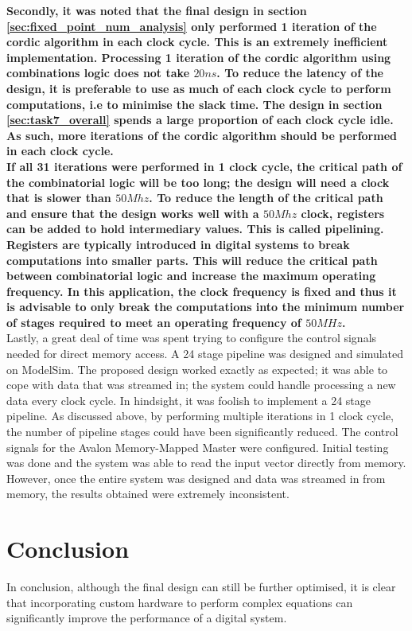 \documentclass{article}
\begin{document}
\textbf{Secondly, it was noted that the final design in section \ref{sec:fixed_point_num_analysis} only performed 1 iteration of the cordic algorithm in each clock cycle. This is an extremely inefficient implementation. Processing 1 iteration of the cordic algorithm using combinations logic does not take $20ns$. To reduce the latency of the design, it is preferable to use as much of each clock cycle to perform computations, i.e to minimise the slack time. The design in section \ref{sec:task7_overall} spends a large proportion of each clock cycle idle. As such, more iterations of the cordic algorithm should be performed in each clock cycle.} \\

\textbf{If all 31 iterations were performed in 1 clock cycle, the critical path of the combinatorial logic will be too long; the design will need a clock that is slower than $50Mhz$. To reduce the length of the critical path and ensure that the design works well with a $50Mhz$ clock, registers can be added to hold intermediary values. This is called pipelining. Registers are typically introduced in digital systems to break computations into smaller parts. This will reduce the critical path between combinatorial logic and increase the maximum operating frequency. In this application, the clock frequency is fixed and thus it is advisable to only break the computations into the minimum number of stages required to meet an operating frequency of $50MHz$.}\\

Lastly, a great deal of time was spent trying to configure the control signals needed for direct memory access. A 24 stage pipeline was designed and simulated on ModelSim. The proposed design worked exactly as expected; it was able to cope with data that was streamed in; the system could handle processing a new data every clock cycle. In hindsight, it was foolish to implement a 24 stage pipeline. As discussed above, by performing multiple iterations in 1 clock cycle, the number of pipeline stages could have been significantly reduced. The control signals for the Avalon Memory-Mapped Master were configured. Initial testing was done and the system was able to read the input vector directly from memory. However, once the entire system was designed and data was streamed in from memory, the results obtained were extremely inconsistent.
 
\section{Conclusion}
In conclusion, although the final design can still be further optimised, it is clear that incorporating custom hardware to perform complex equations can significantly improve the performance of a digital system.\\ 
\end{document}
